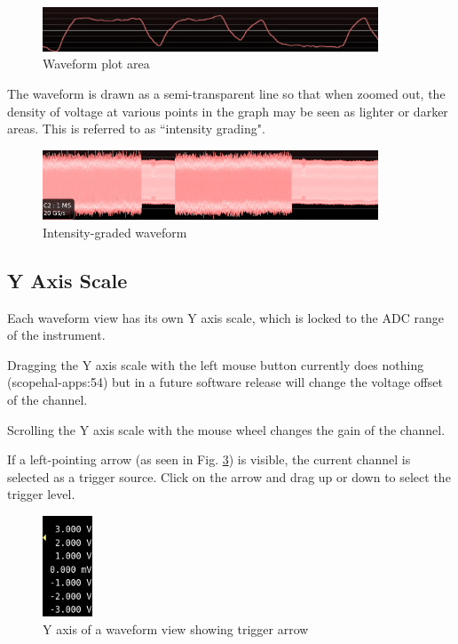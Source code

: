 \documentclass[11pt]{article}
\begin{document}
\begin{figure}[H]
\centering
\includegraphics[width=10cm]{images/waveform-graph.png}
\caption{Waveform plot area}
\label{waveform-graph}
\end{figure}

The waveform is drawn as a semi-transparent line so that when zoomed out, the density of voltage at various points in
the graph may be seen as lighter or darker areas. This is referred to as ``intensity grading".

\begin{figure}[H]
\centering
\includegraphics[width=10cm]{images/graded-waveform.png}
\caption{Intensity-graded waveform}
\label{graded-waveform2}
\end{figure}

\subsection{Y Axis Scale}

Each waveform view has its own Y axis scale, which is locked to the ADC range of the instrument.

Dragging the Y axis scale with the left mouse button currently does nothing (scopehal-apps:54) but in a future software
release will change the voltage offset of the channel.

Scrolling the Y axis scale with the mouse wheel changes the gain of the channel.

If a left-pointing arrow (as seen in Fig. \ref{y-axis}) is visible, the current channel is selected as a trigger
source. Click on the arrow and drag up or down to select the trigger level.

\begin{figure}[H]
\centering
\includegraphics[height=3cm]{images/y-axis.png}
\caption{Y axis of a waveform view showing trigger arrow}
\label{y-axis}
\end{figure}
\end{document}
